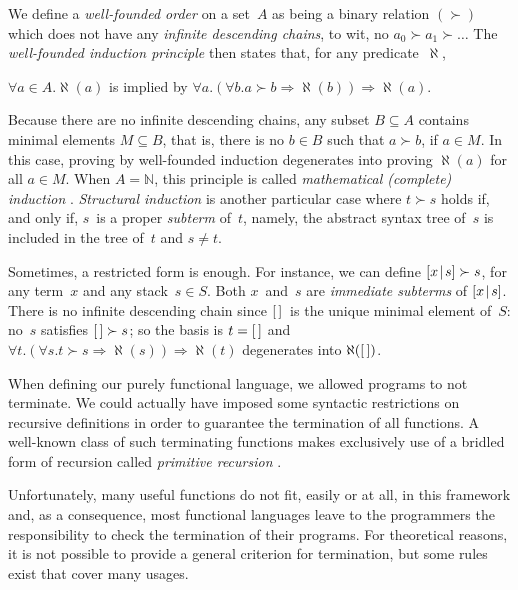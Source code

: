 We define a \emph{well\hyp{}founded order}
\citep{Winskel_1993} on a
set~\(A\) as being a binary relation \((\succ)\) which does not have
any \emph{infinite descending chains}, to wit, no \(a_0 \succ a_1 \succ \dots\) The
\emph{well\hyp{}founded induction principle} then states that, for any
predicate~\(\aleph\),
\begin{center}
  \(\forall a \in A.\aleph(a)\) is implied by \(\forall a.(\forall b.a
  \succ b \Rightarrow \aleph(b)) \Rightarrow \aleph(a)\).
\end{center}
Because there are no infinite descending chains, any
subset \(B \subseteq A\) contains minimal elements \(M \subseteq B\),
that is, there is no \(b \in B\) such that \(a \succ b\), if \(a \in
M\). In this case, proving by well\hyp{}founded induction degenerates
into proving \(\aleph(a)\) for all \(a \in M\). When \(A=\mathbb{N}\),
this principle is called \emph{mathematical (complete) induction}
\citep{Buck_1963}. \emph{Structural induction} is another particular case where \(t \succ s\) holds if, and
only if, \(s\)~is a proper
\emph{subterm}
of~\(t\), namely, the abstract syntax tree of~\(s\) is included in the
tree of~\(t\) and \(s \neq t\).

Sometimes, a restricted form is enough. For instance, we can define
\([{x}\!\mid\!{s}] \succ s\), for any term~\(x\)
and any stack~\(s \in S\). Both \(x\)~and~\(s\) are \emph{immediate
  subterms} of
\([{x}\!\mid\!{s}]\). There is no infinite
descending chain since \([\,]\)~is the unique minimal element of~\(S\):
no~\(s\) satisfies \([\,] \succ s\); so the basis is \(t=[\,]\) and
\(\forall t.(\forall s.t \succ s \Rightarrow \aleph(s)) \Rightarrow
\aleph(t)\) degenerates into \(\aleph([\,])\).

\label{par:ackermann}
When defining our purely functional language, we allowed programs to
not terminate. We could actually have imposed some syntactic
restrictions on recursive definitions in order to guarantee the
termination of all functions. A well\hyp{}known class of such
terminating functions makes exclusively use of a bridled form of
recursion called \emph{primitive recursion}
\citep{Robinson_1947,Robinson_1948}.

Unfortunately, many useful functions do not fit, easily or at all, in
this framework and, as a consequence, most functional languages leave
to the programmers the responsibility to check the termination of
their programs. For theoretical reasons, it is not possible to provide
a general criterion for termination, but some rules exist that cover
many usages.

